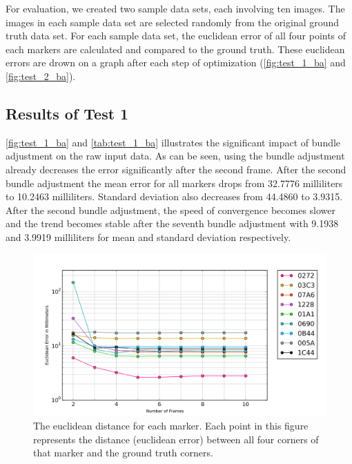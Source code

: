 For evaluation, we created two sample data sets, each involving ten images. The images in each sample data set are selected randomly from the original ground truth data set. For each sample data set, the euclidean error of all four points of each markers are calculated and compared to the ground truth. These euclidean errors are drown on a graph after each step of optimization (\autoref{fig:test_1_ba} and \autoref{fig:test_2_ba}).

\subsection{Results of Test 1} \label{subsec:result_ba_1}
\autoref{fig:test_1_ba} and \autoref{tab:test_1_ba} illustrates the significant impact of bundle adjustment on the raw input data. As can be seen, using the bundle adjustment already decreases the error significantly after the second frame. After the second bundle adjustment the mean error for all markers drops from 32.7776 milliliters to 10.2463 milliliters. Standard deviation also decreases from 44.4860 to 3.9315. After the second bundle adjustment, the speed of convergence becomes slower and the trend becomes stable after the seventh bundle adjustment with 9.1938 and 3.9919 milliliters for mean and standard deviation respectively.

\begin{figure}[H]
  \centering
  \includegraphics[width=160mm]{figures/graph_test_1}
  \caption{The euclidean distance for each marker. Each point in this figure represents the distance (euclidean error) between all four corners of that marker and the ground truth corners.}\label{fig:test_1_ba}
\end{figure}

